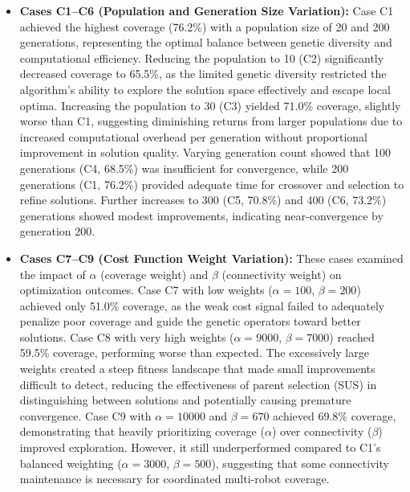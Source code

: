 \begin{itemize}
    \item \textbf{Cases C1–C6 (Population and Generation Size Variation):} 
    Case C1 achieved the highest coverage (76.2\%) with a population size of 20 and 200 generations, representing the optimal balance between genetic diversity and computational efficiency.
    Reducing the population to 10 (C2) significantly decreased coverage to 65.5\%, as the limited genetic diversity restricted the algorithm's ability to explore the solution space effectively and escape local optima.
    Increasing the population to 30 (C3) yielded 71.0\% coverage, slightly worse than C1, suggesting diminishing returns from larger populations due to increased computational overhead per generation without proportional improvement in solution quality.
    Varying generation count showed that 100 generations (C4, 68.5\%) was insufficient for convergence, while 200 generations (C1, 76.2\%) provided adequate time for crossover and selection to refine solutions. Further increases to 300 (C5, 70.8\%) and 400 (C6, 73.2\%) generations showed modest improvements, indicating near-convergence by generation 200.

    \item \textbf{Cases C7–C9 (Cost Function Weight Variation):}
    These cases examined the impact of $\alpha$ (coverage weight) and $\beta$ (connectivity weight) on optimization outcomes.
    Case C7 with low weights ($\alpha=100$, $\beta=200$) achieved only 51.0\% coverage, as the weak cost signal failed to adequately penalize poor coverage and guide the genetic operators toward better solutions.
    Case C8 with very high weights ($\alpha=9000$, $\beta=7000$) reached 59.5\% coverage, performing worse than expected. The excessively large weights created a steep fitness landscape that made small improvements difficult to detect, reducing the effectiveness of parent selection (SUS) in distinguishing between solutions and potentially causing premature convergence.
    Case C9 with $\alpha=10000$ and $\beta=670$ achieved 69.8\% coverage, demonstrating that heavily prioritizing coverage ($\alpha$) over connectivity ($\beta$) improved exploration. However, it still underperformed compared to C1's balanced weighting ($\alpha=3000$, $\beta=500$), suggesting that some connectivity maintenance is necessary for coordinated multi-robot coverage.


\end{itemize}

